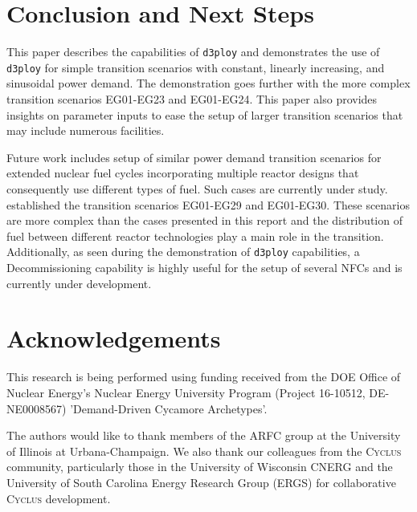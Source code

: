 \documentclass[11pt]{article}
\newcommand{\Cyclus}{\textsc{Cyclus}\xspace}%
\newcommand{\deploy}{\texttt{d3ploy}\xspace}%
\begin{document}
\section{Conclusion and Next Steps}
This paper describes the capabilities of \deploy and demonstrates 
the use of \deploy for simple transition scenarios with 
constant, linearly increasing, and sinusoidal power demand.
The demonstration goes further with the more complex transition
scenarios EG01-EG23 and EG01-EG24. This paper also provides insights on
parameter inputs to ease the setup of larger transition scenarios
that may include numerous facilities.

Future work includes setup of similar power demand transition 
scenarios for extended nuclear fuel cycles incorporating multiple reactor designs that consequently use different types of fuel. Such cases are 
currently under study. \cite{wigeland_nuclear_2014} established the transition
scenarios EG01-EG29 and EG01-EG30. These scenarios are more complex than the
cases presented in this report and the distribution of fuel between different
reactor technologies play a main role in the transition.
Additionally, as seen during the demonstration of \deploy capabilities, a Decommissioning capability is highly useful for the setup of several NFCs and is currently under development.

\section{Acknowledgements}
This research is being performed using funding received from the \gls{DOE} Office of 
Nuclear Energy's Nuclear Energy University Program (Project 16-10512, 
DE-NE0008567) 'Demand-Driven Cycamore Archetypes'.

The authors would like to thank 
members of the \gls{ARFC} group at the University of Illinois at 
Urbana-Champaign. 
We also thank our colleagues from the \Cyclus community, 
particularly those in the University of Wisconsin 
\gls{CNERG} and the University of South Carolina Energy Research 
Group (ERGS) for collaborative \Cyclus development.

\pagebreak 


\end{document}
